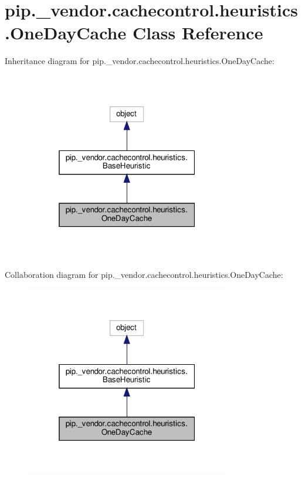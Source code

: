 \hypertarget{classpip_1_1__vendor_1_1cachecontrol_1_1heuristics_1_1OneDayCache}{}\section{pip.\+\_\+vendor.\+cachecontrol.\+heuristics.\+One\+Day\+Cache Class Reference}
\label{classpip_1_1__vendor_1_1cachecontrol_1_1heuristics_1_1OneDayCache}


Inheritance diagram for pip.\+\_\+vendor.\+cachecontrol.\+heuristics.\+One\+Day\+Cache\+:
\nopagebreak
\begin{figure}[H]
\begin{center}
\leavevmode
\includegraphics[width=253pt]{classpip_1_1__vendor_1_1cachecontrol_1_1heuristics_1_1OneDayCache__inherit__graph}
\end{center}
\end{figure}


Collaboration diagram for pip.\+\_\+vendor.\+cachecontrol.\+heuristics.\+One\+Day\+Cache\+:
\nopagebreak
\begin{figure}[H]
\begin{center}
\leavevmode
\includegraphics[width=253pt]{classpip_1_1__vendor_1_1cachecontrol_1_1heuristics_1_1OneDayCache__coll__graph}
\end{center}
\end{figure}
